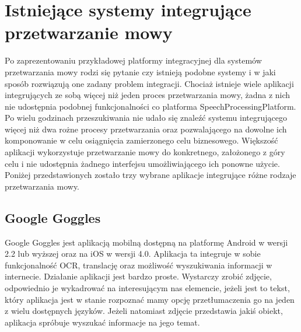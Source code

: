 


\ifpdf
    \graphicspath{{5/figures/PNG/}{5/figures/PDF/}{5/figures/}}
\else
    \graphicspath{{5/figures/EPS/}{5/figures/}}
\fi

\chapter{Istniejące systemy integrujące przetwarzanie mowy} %

Po zaprezentowaniu przykładowej platformy integracyjnej dla systemów przetwarzania mowy rodzi się pytanie czy istnieją podobne systemy i w jaki sposób rozwiązują one zadany problem integracji. Chociaż istnieje wiele aplikacji integrujących ze sobą więcej niż jeden proces przetwarzania mowy, żadna z nich nie udostępnia podobnej funkcjonalności co platforma SpeechProcessingPlatform. Po wielu godzinach przeszukiwania nie udało się znaleźć systemu integrującego więcej niż dwa rożne procesy przetwarzania oraz pozwalającego na dowolne ich komponowanie w celu osiągnięcia zamierzonego celu biznesowego. Większość aplikacji wykorzystuje przetwarzanie mowy do konkretnego, założonego z góry celu i nie udostępnia żadnego interfejsu umożliwiającego ich ponowne użycie. Poniżej przedstawionych zostało trzy wybrane aplikacje integrujące różne rodzaje przetwarzania mowy.

\section {Google Goggles}

Google Goggles\cite{googlegoggles} jest aplikacją mobilną dostępną na platformę Android w wersji 2.2 lub wyższej oraz na iOS w wersji 4.0. Aplikacja ta integruje w sobie funkcjonalność OCR, translację oraz możliwość wyszukiwania informacji w internecie. Działanie aplikacji jest bardzo proste. Wystarczy zrobić zdjęcie, odpowiednio je wykadrować na interesującym nas elemencie, jeżeli jest to tekst, który aplikacja jest w stanie rozpoznać mamy opcję przetłumaczenia go na jeden z wielu dostępnych języków. Jeżeli natomiast zdjęcie przedstawia jakiś obiekt, aplikacja spróbuje wyszukać informacje na jego temat.	

